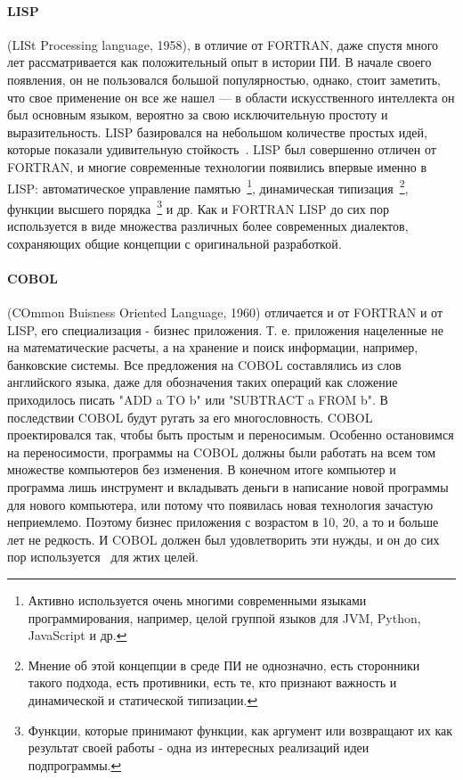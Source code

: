 \paragraph{LISP} (LISt Processing language, 1958), в отличие от FORTRAN, даже спустя много лет рассматривается как положительный опыт в истории ПИ. В начале своего появления, он не пользовался большой популярностью, однако, стоит заметить, что свое применение он все же нашел — в области искусственного интеллекта он был основным языком, вероятно за свою исключительную простоту и выразительность. LISP базировался на небольшом количестве простых идей, которые показали удивительную стойкость~\cite{Dikkstra:1972:HP}. LISP был совершенно отличен от FORTRAN, и многие современные технологии появились впервые именно в LISP: автоматическое управление памятью~\footnote{Активно используется очень многими современными языками программирования, например, целой группой языков для JVM, Python, JavaScript и др.}, динамическая типизация~\footnote{Мнение об этой концепции в среде ПИ не однозначно, есть сторонники такого подхода, есть противники, есть те, кто признают важность и динамической и статической типизации.}, функции высшего порядка~\footnote{Функции, которые принимают функции, как аргумент или возвращают их как результат своей работы - одна из интересных реализаций идеи подпрограммы.} и др. Как и FORTRAN LISP до сих пор используется в виде множества различных более современных диалектов, сохраняющих общие концепции с оригинальной разработкой.

\paragraph{COBOL} (COmmon Buisness Oriented Language, 1960) отличается и от FORTRAN и от LISP, его специализация - бизнес приложения. Т. е. приложения нацеленные не на математические расчеты, а на хранение и поиск информации, например, банковские системы. Все предложения на COBOL составлялись из слов английского языка, даже для обозначения таких операций как сложение приходилось писать "ADD a TO b" или "SUBTRACT a FROM b". В последствии COBOL будут ругать за его многословность. COBOL проектировался так, чтобы быть простым и переносимым. Особенно остановимся на переносимости, программы на COBOL должны были работать на всем том множестве компьютеров без изменения. В конечном итоге компьютер и программа лишь инструмент и вкладывать деньги в написание новой программы для нового компьютера, или потому что появилась новая технология зачастую неприемлемо. Поэтому бизнес приложения с возрастом в 10, 20, а то и больше лет не редкость. И COBOL должен был удовлетворить эти нужды, и он до сих пор используется~\cite{Mitchell:2006:CND} для жтих целей.

